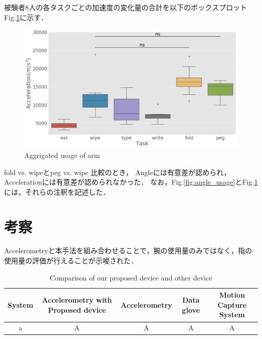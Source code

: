 被験者8人の各タスクごとの加速度の変化量の合計を以下のボックスプロットFig.\ref{fig:accel_usage}に示す．

\begin{figure}[H]
  \centering
  \includegraphics[width=0.8\linewidth]{fig/boxplot_accel}
  \caption{Aggrigated usage of arm}
  \label{fig:accel_usage}
\end{figure}

fold vs. wipeとpeg vs. wipe 比較のとき，
Angleには有意差が認められ，Accelerationには有意差が認められなかった．
なお，Fig.\ref{fig:angle_usage}とFig.\ref{fig:accel_usage}には，それらの注釈を記述した．



\section{考察}
Accelerometryと本手法を組み合わせることで，腕の使用量のみではなく，指の使用量の評価が行えることが示唆された．

\begin{table}[H]
  \caption{Comparison of our proposed device and other device}
  \label{table:comparison}
  \centering
  \begin{tabular}{ccccc}
    \hline
    System &  Accelerometry with Proposed device & Accelerometry & Data glove & Motion Capture System\\
    \hline \hline
    a&A&A&A&A\\


    \hline
  \end{tabular}
\end{table}




